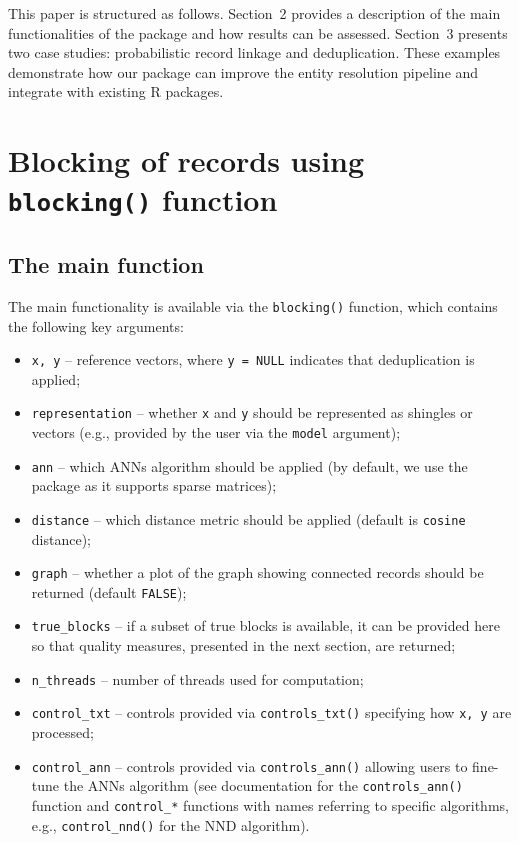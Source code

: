This paper is structured as follows. Section~2 provides a description of
the main functionalities of the  package and how
results can be assessed. Section~3 presents two case studies:
probabilistic record linkage and deduplication. These examples
demonstrate how our package can improve the entity resolution pipeline
and integrate with existing R packages.

\section{\texorpdfstring{Blocking of records using \texttt{blocking()} function}{Blocking of records using blocking() function}}\label{sec-blocks}

\subsection{The main function}\label{the-main-function}

The main functionality is available via the \texttt{blocking()} function, which
contains the following key arguments:

\begin{itemize}
\tightlist
\item
  \texttt{x,\ y} -- reference vectors, where \texttt{y\ =\ NULL} indicates that
  deduplication is applied;
\item
  \texttt{representation} -- whether \texttt{x} and \texttt{y} should be represented as
  shingles or vectors (e.g., provided by the user via the \texttt{model}
  argument);
\item
  \texttt{ann} -- which ANNs algorithm should be applied (by default, we use
  the  package as it supports sparse matrices);
\item
  \texttt{distance} -- which distance metric should be applied (default is
  \texttt{cosine} distance);
\item
  \texttt{graph} -- whether a plot of the graph showing connected records
  should be returned (default \texttt{FALSE});
\item
  \texttt{true\_blocks} -- if a subset of true blocks is available, it can be
  provided here so that quality measures, presented in the next
  section, are returned;
\item
  \texttt{n\_threads} -- number of threads used for computation;
\item
  \texttt{control\_txt} -- controls provided via \texttt{controls\_txt()} specifying
  how \texttt{x,\ y} are processed;
\item
  \texttt{control\_ann} -- controls provided via \texttt{controls\_ann()} allowing
  users to fine-tune the ANNs algorithm (see documentation for the
  \texttt{controls\_ann()} function and \texttt{control\_*} functions with names
  referring to specific algorithms, e.g., \texttt{control\_nnd()} for the NND
  algorithm).
\end{itemize}

